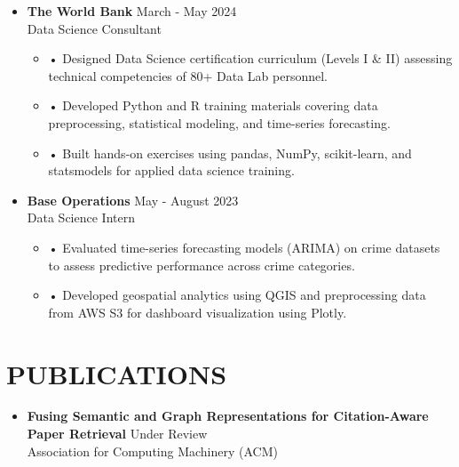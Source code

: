 \documentclass[a4paper,9pt]{extarticle}
\begin{document}
\noindent
\begin{itemize}[leftmargin=0.4cm, label={}]
    \item \textbf{The World Bank} \hfill March - May 2024 \\
    Data Science Consultant
    \vspace{-0.1cm}
    \begin{itemize}[leftmargin=0.3cm, label={}]
    \item \small{•} \normalsize{Designed Data Science certification curriculum (Levels I \& II) assessing 
  technical competencies of 80+ Data Lab personnel.} 
  \item \small{•} \normalsize{Developed Python and R training materials covering data preprocessing, statistical modeling, and time-series forecasting.}
  \item \small{•} \normalsize{Built hands-on exercises using pandas, NumPy, scikit-learn, and statsmodels for applied data science training.} 
    \end{itemize}
\end{itemize}

\noindent
\begin{itemize}[leftmargin=0.4cm, label={}]
    \item \textbf{Base Operations} \hfill May - August 2023 \\
    Data Science Intern
    \vspace{-0.1cm}
    \begin{itemize}[leftmargin=0.3cm, label={}]
        \item \small{•} \normalsize{Evaluated time-series forecasting models (ARIMA) on crime datasets to assess predictive performance across crime categories.}
  \item \small{•} \normalsize{Developed geospatial analytics using QGIS and preprocessing data from AWS S3 for dashboard visualization using Plotly.}
    \end{itemize}
\end{itemize}

\section*{PUBLICATIONS}

\begin{itemize}[leftmargin=0.5cm, label={}]
    \item \textbf{Fusing Semantic and Graph Representations for Citation-Aware Paper Retrieval} \hfill Under Review \\ 
    Association for Computing Machinery (ACM)
\end{itemize}
\end{document}
